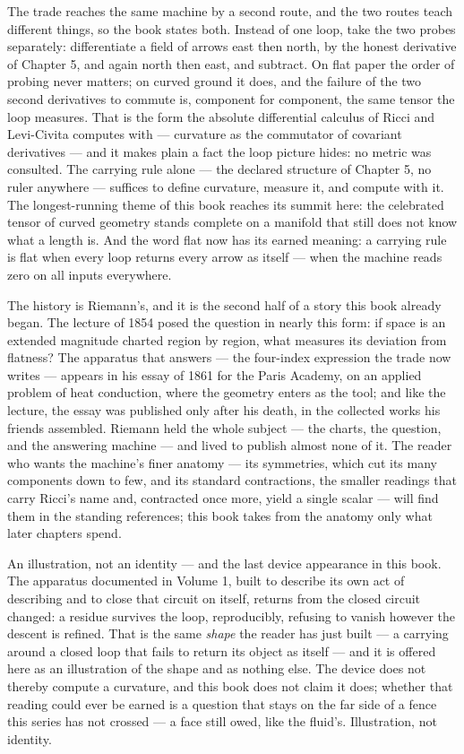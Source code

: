 The trade reaches the same machine by a second route, and the two routes
teach different things, so the book states both. Instead of one loop,
take the two probes separately: differentiate a field of arrows east
then north, by the honest derivative of Chapter 5, and again north then
east, and subtract. On flat paper the order of probing never matters; on
curved ground it does, and the failure of the two second derivatives to
commute is, component for component, the same tensor the loop measures.
That is the form the absolute differential calculus of Ricci and
Levi-Civita computes with --- curvature as the commutator of covariant
derivatives --- and it makes plain a fact the loop picture hides: no
metric was consulted. The carrying rule alone --- the declared structure
of Chapter 5, no ruler anywhere --- suffices to define curvature,
measure it, and compute with it. The longest-running theme of this book
reaches its summit here: the celebrated tensor of curved geometry stands
complete on a manifold that still does not know what a length is. And
the word flat now has its earned meaning: a carrying rule is flat when
every loop returns every arrow as itself --- when the machine reads zero
on all inputs everywhere.

The history is Riemann's, and it is the second half of a story this book
already began. The lecture of 1854 posed the question in nearly this
form: if space is an extended magnitude charted region by region, what
measures its deviation from flatness? The apparatus that answers ---
the four-index expression the trade now writes --- appears in his essay
of 1861 for the Paris Academy, on an applied problem of heat conduction,
where the geometry enters as the tool; and like the lecture, the essay
was published only after his death, in the collected works his friends
assembled. Riemann held the whole subject --- the charts, the question,
and the answering machine --- and lived to publish almost none of it.
The reader who wants the machine's finer anatomy --- its symmetries,
which cut its many components down to few, and its standard contractions,
the smaller readings that carry Ricci's name and, contracted once more,
yield a single scalar --- will find them in the standing references;
this book takes from the anatomy only what later chapters spend.

\begin{fence}
An illustration, not an identity --- and the last device appearance in
this book. The apparatus documented in Volume 1, built to describe its
own act of describing and to close that circuit on itself, returns from
the closed circuit changed: a residue survives the loop, reproducibly,
refusing to vanish however the descent is refined. That is the same
\emph{shape} the reader has just built --- a carrying around a closed
loop that fails to return its object as itself --- and it is offered
here as an illustration of the shape and as nothing else. The device
does not thereby compute a curvature, and this book does not claim it
does; whether that reading could ever be earned is a question that
stays on the far side of a fence this series has not crossed --- a face
still owed, like the fluid's. Illustration, not identity.
\end{fence}

